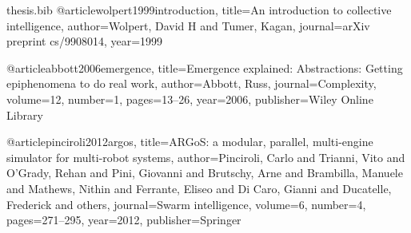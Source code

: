 \documentclass[a4paper, 12pt]{report}
\begin{document}
\begin{filecontents}{thesis.bib}
@article{wolpert1999introduction,
  title={An introduction to collective intelligence},
  author={Wolpert, David H and Tumer, Kagan},
  journal={arXiv preprint cs/9908014},
  year={1999}
}

@article{abbott2006emergence,
  title={Emergence explained: Abstractions: Getting epiphenomena to do real work},
  author={Abbott, Russ},
  journal={Complexity},
  volume={12},
  number={1},
  pages={13--26},
  year={2006},
  publisher={Wiley Online Library}
}

@article{pinciroli2012argos,
  title={ARGoS: a modular, parallel, multi-engine simulator for multi-robot systems},
  author={Pinciroli, Carlo and Trianni, Vito and O’Grady, Rehan and Pini, Giovanni and Brutschy, Arne and Brambilla, Manuele and Mathews, Nithin and Ferrante, Eliseo and Di Caro, Gianni and Ducatelle, Frederick and others},
  journal={Swarm intelligence},
  volume={6},
  number={4},
  pages={271--295},
  year={2012},
  publisher={Springer}
}


\end{filecontents}

\nocite{*}


\end{document}
